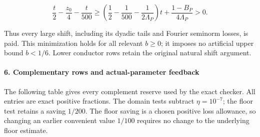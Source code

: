 \[
\frac t2-\frac{z_0}{4}-\frac{t}{500}
\ge\left(\frac12-\frac1{500}-\frac1{2\Lambda_P}\right)t
 +\frac{1-B_P}{4\Lambda_P}>0.
\tag{FR22}
\]

Thus every large shift, including its dyadic tails and Fourier seminorm losses, is paid. This minimization holds for all relevant \(b\ge0\); it imposes no artificial upper bound \(b<1/6\). Lower conductor rows retain the original natural shift argument.

\hypertarget{first-return:complementary-rows-and-actual-parameter-feedback}{%
\paragraph{6. Complementary rows and actual-parameter feedback}\label{first-return:complementary-rows-and-actual-parameter-feedback}}

The following table gives every complement reserve used by the exact checker. All entries are exact positive fractions. The domain tests subtract \(\eta=10^{-7}\); the floor test retains a saving \(1/200\). The floor saving is a chosen positive loss allowance, so changing an earlier convenient value \(1/100\) requires no change to the underlying floor estimate.

